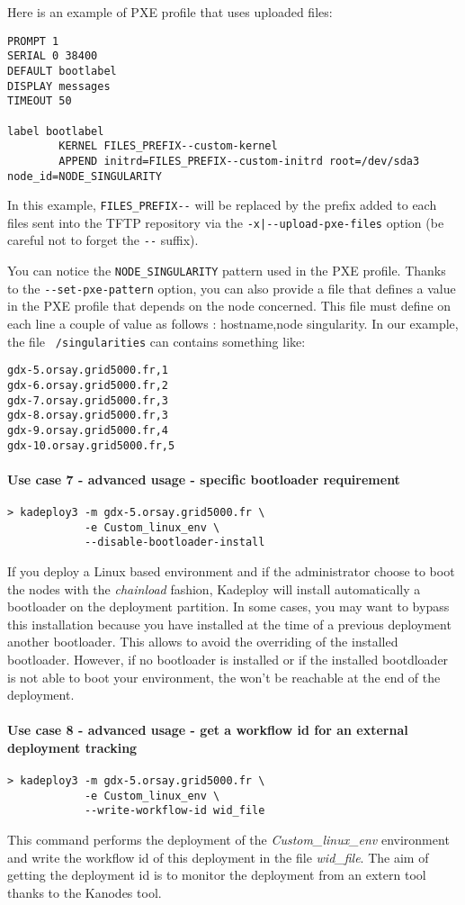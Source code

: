 \documentclass[a4wide,10pt,oneside]{book}
\begin{document}
Here is an example of PXE profile that uses uploaded files:
\begin{verbatim}
PROMPT 1
SERIAL 0 38400
DEFAULT bootlabel
DISPLAY messages
TIMEOUT 50

label bootlabel
        KERNEL FILES_PREFIX--custom-kernel
        APPEND initrd=FILES_PREFIX--custom-initrd root=/dev/sda3 node_id=NODE_SINGULARITY
\end{verbatim}

In this example, \texttt{FILES\_PREFIX-{}-} will be replaced by the prefix added to each files sent into the TFTP repository via the \texttt{-x|-{}-upload-pxe-files} option (be careful not to forget the \texttt{-{}-} suffix).

You can notice the \texttt{NODE\_SINGULARITY} pattern used in the PXE profile. Thanks to the \texttt{-{}-set-pxe-pattern} option, you can also provide a file that defines a value in the PXE profile that depends on the node concerned. This file must define on each line a couple of value as follows : hostname,node singularity. In our example, the file \texttt{~/singularities} can contains something like:
\begin{verbatim}
gdx-5.orsay.grid5000.fr,1
gdx-6.orsay.grid5000.fr,2
gdx-7.orsay.grid5000.fr,3
gdx-8.orsay.grid5000.fr,3
gdx-9.orsay.grid5000.fr,4
gdx-10.orsay.grid5000.fr,5
\end{verbatim}

\paragraph{Use case 7 - advanced usage - specific bootloader requirement}
\begin{verbatim}
> kadeploy3 -m gdx-5.orsay.grid5000.fr \
            -e Custom_linux_env \
            --disable-bootloader-install
\end{verbatim}
If you deploy a Linux based environment and if the administrator choose to boot the nodes with the \textit{chainload} fashion, Kadeploy will install automatically a bootloader on the deployment partition. In some cases, you may want to bypass this installation because you have installed at the time of a previous deployment another bootloader. This allows to avoid the overriding of the installed bootloader. However, if no bootloader is installed or if the installed bootdloader is not able to boot your environment, the won't be reachable at the end of the deployment.

\paragraph{Use case 8 - advanced usage - get a workflow id for an external deployment tracking}\label{par:usecase-wid}
\begin{verbatim}
> kadeploy3 -m gdx-5.orsay.grid5000.fr \
            -e Custom_linux_env \
            --write-workflow-id wid_file
\end{verbatim}
This command performs the deployment of the \textit{Custom\_linux\_env} environment and write the workflow id of this deployment in the file \textit{wid\_file}. The aim of getting the deployment id is to monitor the deployment from an extern tool thanks to the Kanodes tool.
\end{document}
